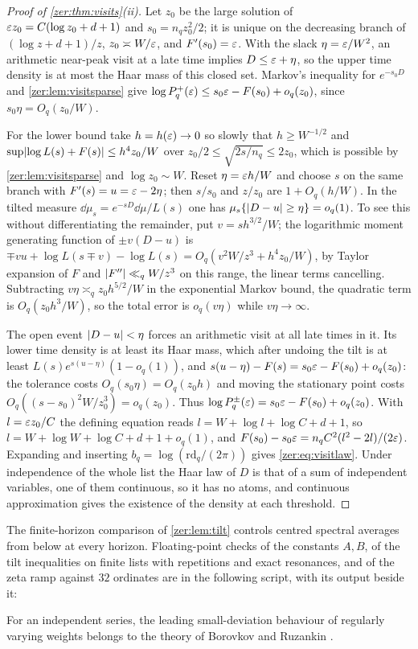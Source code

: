 \begin{proof}[Proof of \cref{zer:thm:visits}\textup{(ii)}]
Let $z_0$ be the large solution of $\varepsilon z_0=C(\log z_0+d+1)$ and $s_0=n_qz_0^2/2$; it is unique on
the decreasing branch of $(\log z+d+1)/z$, $z_0\asymp W/\varepsilon$, and $F'(s_0)=\varepsilon$. With the slack
$\eta=\varepsilon/W^2$, an arithmetic near-peak visit at a late time implies $D\le\varepsilon+\eta$, so the upper
time density is at most the Haar mass of this closed set. Markov's inequality for $e^{-s_0D}$ and
\cref{zer:lem:visitsparse} give $\log P_q^+(\varepsilon)\le s_0\varepsilon-F(s_0)+o_q(z_0)$, since
$s_0\eta=O_q(z_0/W)$.

For the lower bound take $h=h(\varepsilon)\to0$ so slowly that $h\ge W^{-1/2}$ and
$\sup\lvert\log L(s)+F(s)\rvert\le h^4z_0/W$ over $z_0/2\le\sqrt{2s/n_q}\le2z_0$, which is possible by
\cref{zer:lem:visitsparse} and $\log z_0\sim W$. Reset $\eta=\varepsilon h/W$ and choose $s$ on the same
branch with $F'(s)=u=\varepsilon-2\eta$; then $s/s_0$ and $z/z_0$ are $1+O_q(h/W)$. In the tilted measure
$\dd\mu_s=e^{-sD}\dd\mu/L(s)$ one has $\mu_s\{\lvert D-u\rvert\ge\eta\}=o_q(1)$. To see this without
differentiating the remainder, put $v=sh^{3/2}/W$; the logarithmic moment generating function of
$\pm v(D-u)$ is $\mp vu+\log L(s\mp v)-\log L(s)=O_q(v^2W/z^3+h^4z_0/W)$, by Taylor expansion of $F$
and $\lvert F''\rvert\ll_qW/z^3$ on this range, the linear terms cancelling. Subtracting
$v\eta\asymp_qz_0h^{5/2}/W$ in the exponential Markov bound, the quadratic term is
$O_q(z_0h^3/W)$, so the total error is $o_q(v\eta)$ while $v\eta\to\infty$.

The open event $\lvert D-u\rvert<\eta$ forces an arithmetic visit at all late times in it. Its lower time
density is at least its Haar mass, which after undoing the tilt is at least
$L(s)e^{s(u-\eta)}(1-o_q(1))$, and $s(u-\eta)-F(s)=s_0\varepsilon-F(s_0)+o_q(z_0)$: the tolerance costs
$O_q(s_0\eta)=O_q(z_0h)$ and moving the stationary point costs $O_q((s-s_0)^2W/z_0^3)=o_q(z_0)$. Thus
$\log P_q^\pm(\varepsilon)=s_0\varepsilon-F(s_0)+o_q(z_0)$. With $l=\varepsilon z_0/C$ the defining equation reads
$l=W+\log l+\log C+d+1$, so $l=W+\log W+\log C+d+1+o_q(1)$, and
$F(s_0)-s_0\varepsilon=n_qC^2(l^2-2l)/(2\varepsilon)$. Expanding and inserting $b_q=\log(\mathrm{rd}_q/(2\pi))$ gives
\eqref{zer:eq:visitlaw}. Under independence of the whole list the Haar law of $D$ is that of a sum of
independent variables, one of them continuous, so it has no atoms, and continuous approximation
gives the existence of the density at each threshold.
\end{proof}

The finite-horizon comparison of \cref{zer:lem:tilt} controls centred spectral averages from below
at every horizon. Floating-point checks of the constants $A,B$, of the tilt inequalities on
finite lists with repetitions and exact resonances, and of the zeta ramp against $32$ ordinates are
in the following script, with its output beside it:
\begin{center}\footnotesize
{}
\end{center}
For an
independent series, the leading small-deviation behaviour of regularly varying weights belongs to
the theory of Borovkov and Ruzankin \cite{BorovkovRuzankin2008Small}.

